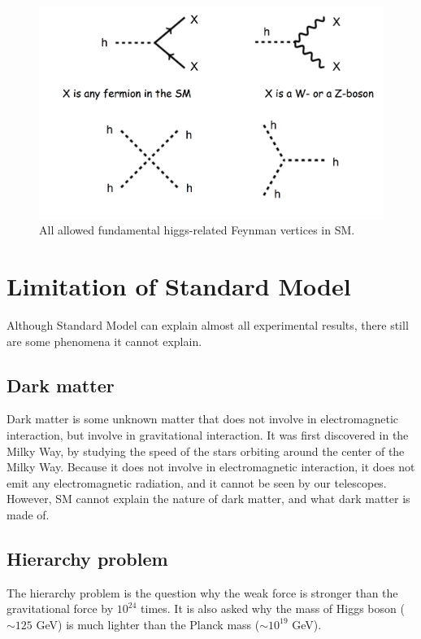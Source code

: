 \begin{figure}
\centering
\includegraphics[width=\textwidth]{data/photo/theory/vertices_higgs.png}
\caption{All allowed fundamental higgs-related Feynman vertices in SM.}
\label{fig:vertices_higgs}
\end{figure}

\section{Limitation of Standard Model}
\label{sec:Limitation_Standard_Model}
Although Standard Model can explain almost all experimental results, there still are some phenomena it cannot explain.

\subsection{Dark matter}
Dark matter is some unknown matter that does not involve in electromagnetic interaction, but involve in gravitational interaction.
It was first discovered in the Milky Way, by studying the speed of the stars orbiting around the center of the Milky Way.
Because it does not involve in electromagnetic interaction, it does not emit any electromagnetic radiation, and it cannot be seen by our telescopes.
However, SM cannot explain the nature of dark matter, and what dark matter is made of.

\subsection{Hierarchy problem}
\label{subsec:hierarchy_problem}
The hierarchy problem is the question why the weak force is stronger than the gravitational force by $10^{24}$ times.
It is also asked why the mass of Higgs boson ($\sim 125$ GeV) is much lighter than the Planck mass ($\sim 10^{19}$ GeV).

